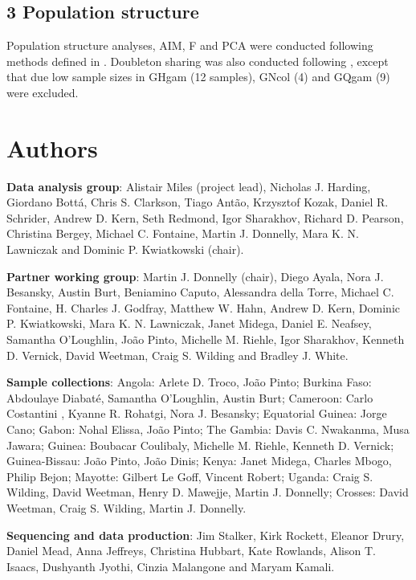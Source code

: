 \documentclass[a4paper,11pt,abstracton,hidelinks]{scrartcl}
\begin{document}
\subsection*{3 Population structure}

%
Population structure analyses, AIM, F and PCA were conducted following methods defined in \cite{Ag1000gConsortium2017}.
%
Doubleton sharing was also conducted following \cite{Ag1000gConsortium2017}, except that due low sample sizes in GHgam (12 samples), GNcol (4) and GQgam (9) were excluded.  


\section*{Authors}

%
\textbf{Data analysis group}: Alistair Miles (project lead), Nicholas J. Harding, Giordano Bott\'{a}, Chris S. Clarkson, Tiago Ant\~{a}o, Krzysztof Kozak, Daniel R. Schrider, Andrew D. Kern, Seth Redmond, Igor Sharakhov, Richard D. Pearson, Christina Bergey, Michael C. Fontaine, Martin J. Donnelly, Mara K. N. Lawniczak and Dominic P. Kwiatkowski (chair).

%
\textbf{Partner working group}: Martin J. Donnelly (chair), Diego Ayala, Nora J. Besansky, Austin Burt, Beniamino Caputo, Alessandra della Torre, Michael C. Fontaine, H. Charles J. Godfray, Matthew W. Hahn, Andrew D. Kern, Dominic P. Kwiatkowski, Mara K. N. Lawniczak, Janet Midega, Daniel E. Neafsey, Samantha O'Loughlin, Jo\~{a}o Pinto, Michelle M. Riehle, Igor Sharakhov, Kenneth D. Vernick, David Weetman, Craig S. Wilding and Bradley J. White.

%
\textbf{Sample collections}: Angola: Arlete D. Troco, Jo\~{a}o Pinto; Burkina Faso: Abdoulaye Diabat\'{e}, Samantha O'Loughlin, Austin Burt; Cameroon: Carlo Costantini , Kyanne R. Rohatgi, Nora J. Besansky; Equatorial Guinea: Jorge Cano; Gabon: Nohal Elissa, Jo\~{a}o Pinto; The Gambia: Davis C. Nwakanma, Musa Jawara; Guinea: Boubacar Coulibaly, Michelle M. Riehle, Kenneth D. Vernick; Guinea-Bissau: Jo\~{a}o Pinto, Jo\~{a}o Dinis; Kenya: Janet Midega, Charles Mbogo, Philip Bejon; Mayotte: Gilbert Le Goff, Vincent Robert; Uganda: Craig S. Wilding, David Weetman, Henry D. Mawejje, Martin J. Donnelly; Crosses: David Weetman, Craig S. Wilding, Martin J. Donnelly.

%
\textbf{Sequencing and data production}: Jim Stalker, Kirk Rockett, Eleanor Drury, Daniel Mead, Anna Jeffreys, Christina Hubbart, Kate Rowlands, Alison T. Isaacs, Dushyanth Jyothi, Cinzia Malangone and Maryam Kamali.
\end{document}
